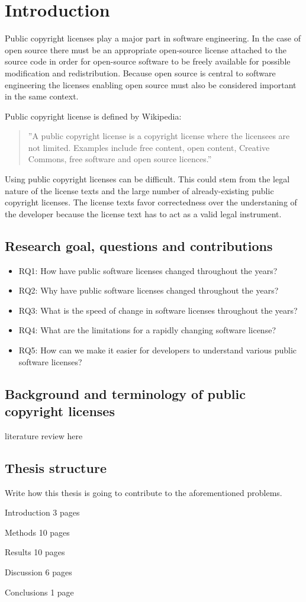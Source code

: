 \chapter{Introduction\label{intro}}

Public copyright licenses play a major part in software engineering. In the case of open source there must be an appropriate open-source license attached to the source code in order for open-source software to be freely available for possible modification and redistribution. Because open source is central to software engineering the licenses enabling open source must also be considered important in the same context.

Public copyright license is defined by Wikipedia:
\begin{quote}
	''A public copyright license is a copyright license where the licensees are not limited. Examples include free content, open content, Creative Commons, free software and open source licences.''
\end{quote} \citep{wiki:publiclicenses}

Using public copyright licenses can be difficult. This could stem from the legal nature of the license texts and the large number of already-existing public copyright licenses. The license texts favor correctedness over the understaning of the developer because the license text has to act as a valid legal instrument.

\section{Research goal, questions and contributions}

\begin{itemize}
	\item RQ1: How have public software licenses changed throughout the years?
	\item RQ2: Why have public software licenses changed throughout the years?
	\item RQ3: What is the speed of change in software licenses throughout the years?
	\item RQ4: What are the limitations for a rapidly changing software license?
	\item RQ5: How can we make it easier for developers to understand various public software licenses?
\end{itemize}

\section{Background and terminology of public copyright licenses}
literature review here

\section{Thesis structure}

Write how this thesis is going to contribute to the aforementioned problems.

Introduction 3 pages

Methods 10 pages

Results 10 pages

Discussion 6 pages

Conclusions 1 page
